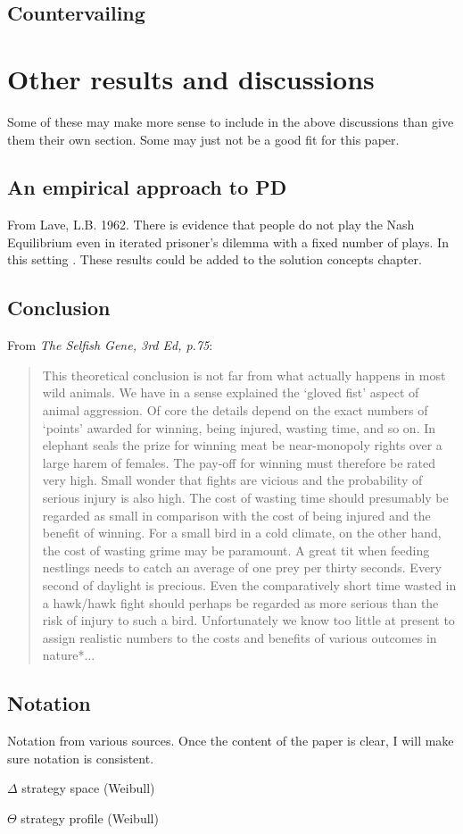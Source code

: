 \section{Countervailing}

\chapter{Other results and discussions}
Some of these may make more sense to include in the above discussions than give them their own section. Some may just not be a good fit for this paper.
\section{An empirical approach to PD}
From Lave, L.B. 1962. There is evidence that people do not play the Nash Equilibrium even in iterated prisoner's dilemma with a fixed number of plays. In this setting . These results could be added to the solution concepts chapter.

\section{Conclusion}
From \emph{The Selfish Gene, 3rd Ed, p.75}:
\begin{quote}
This theoretical conclusion is not far from what actually happens in most wild animals. We have in a sense explained the `gloved fist' aspect of animal aggression. Of core the details depend on the exact numbers of `points' awarded for winning, being injured, wasting time, and so on. In elephant seals the prize for winning meat be near-monopoly rights over a large harem of females. The pay-off for winning must therefore be rated very high. Small wonder that fights are vicious and the probability of serious injury is also high. The cost of wasting time should presumably be regarded as small in comparison with the cost of being injured and the benefit of winning. For a small bird in a cold climate, on the other hand, the cost of wasting grime may be paramount. A great tit when feeding nestlings needs to catch an average of one prey per thirty seconds. Every second of daylight is precious. Even the comparatively short time wasted in a hawk/hawk fight should perhaps be regarded as more serious than the risk of injury to such a bird. Unfortunately we know too little at present to assign realistic numbers to the costs and benefits of various outcomes in nature*...
\end{quote}

\section{Notation}
Notation from various sources. Once the content of the paper is clear, I will make sure notation is consistent. 

$\Delta$ strategy space (Weibull)

$\Theta$ strategy profile (Weibull)









